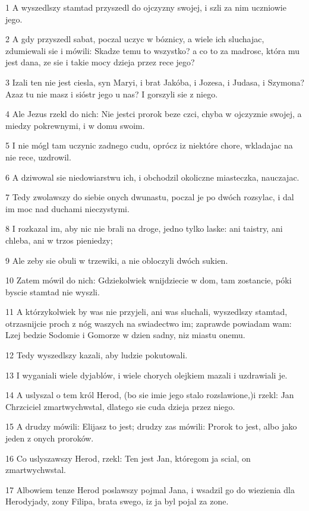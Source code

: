 \par 1 A wyszedlszy stamtad przyszedl do ojczyzny swojej, i szli za nim uczniowie jego.
\par 2 A gdy przyszedl sabat, poczal uczyc w bóznicy, a wiele ich sluchajac, zdumiewali sie i mówili: Skadze temu to wszystko? a co to za madrosc, która mu jest dana, ze sie i takie mocy dzieja przez rece jego?
\par 3 Izali ten nie jest ciesla, syn Maryi, i brat Jakóba, i Jozesa, i Judasa, i Szymona? Azaz tu nie masz i sióstr jego u nas? I gorszyli sie z niego.
\par 4 Ale Jezus rzekl do nich: Nie jestci prorok beze czci, chyba w ojczyznie swojej, a miedzy pokrewnymi, i w domu swoim.
\par 5 I nie mógl tam uczynic zadnego cudu, oprócz iz niektóre chore, wkladajac na nie rece, uzdrowil.
\par 6 A dziwowal sie niedowiarstwu ich, i obchodzil okoliczne miasteczka, nauczajac.
\par 7 Tedy zwolawszy do siebie onych dwunastu, poczal je po dwóch rozsylac, i dal im moc nad duchami nieczystymi.
\par 8 I rozkazal im, aby nic nie brali na droge, jedno tylko laske: ani taistry, ani chleba, ani w trzos pieniedzy;
\par 9 Ale zeby sie obuli w trzewiki, a nie obloczyli dwóch sukien.
\par 10 Zatem mówil do nich: Gdziekolwiek wnijdziecie w dom, tam zostancie, póki byscie stamtad nie wyszli.
\par 11 A którzykolwiek by was nie przyjeli, ani was sluchali, wyszedlszy stamtad, otrzasnijcie proch z nóg waszych na swiadectwo im; zaprawde powiadam wam: Lzej bedzie Sodomie i Gomorze w dzien sadny, niz miastu onemu.
\par 12 Tedy wyszedlszy kazali, aby ludzie pokutowali.
\par 13 I wyganiali wiele dyjablów, i wiele chorych olejkiem mazali i uzdrawiali je.
\par 14 A uslyszal o tem król Herod, (bo sie imie jego stalo rozslawione,)i rzekl: Jan Chrzciciel zmartwychwstal, dlatego sie cuda dzieja przez niego.
\par 15 A drudzy mówili: Elijasz to jest; drudzy zas mówili: Prorok to jest, albo jako jeden z onych proroków.
\par 16 Co uslyszawszy Herod, rzekl: Ten jest Jan, któregom ja scial, on zmartwychwstal.
\par 17 Albowiem tenze Herod poslawszy pojmal Jana, i wsadzil go do wiezienia dla Herodyjady, zony Filipa, brata swego, iz ja byl pojal za zone.
